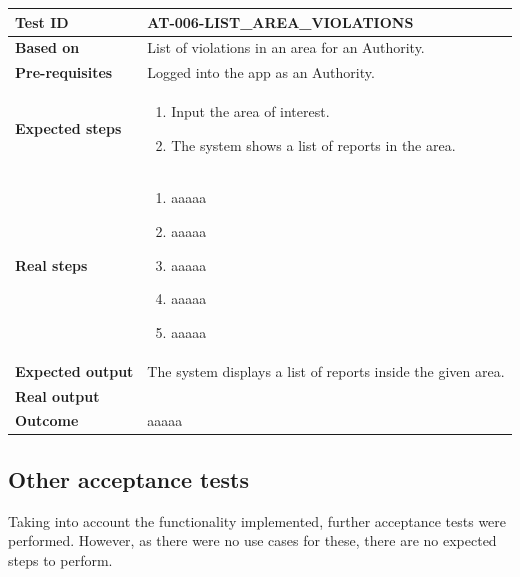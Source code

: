 \begin{table}[H]
    \centering
    \begin{tabular}{p{3cm}p{10cm}}
    \textbf{Test ID} & AT-006-LIST\_AREA\_VIOLATIONS \\ \hline
    \textbf{Based on} & List of violations in an area for an Authority. \\ \hline
    \textbf{Pre-requisites} & Logged into the app as an Authority. \\ \hline
    \textbf{Expected steps} & 
        \begin{enumerate} \itemsep0em
            \item Input the area of interest.
            \item The system shows a list of reports in the area.
        \end{enumerate} \\ \hline
    \textbf{Real steps} & 
        \begin{enumerate} \itemsep0em
            \item aaaaa
            \item aaaaa
            \item aaaaa
            \item aaaaa
            \item aaaaa
        \end{enumerate} \\ \hline
    \textbf{Expected output} & The system displays a list of reports inside the given area. \\ \hline
    \textbf{Real output} &  \\ \hline
    \textbf{Outcome} & aaaaa \\ \hline
    \end{tabular}
\end{table}

\subsection{Other acceptance tests}
Taking into account the functionality implemented, further acceptance tests were performed. However, as there were no use cases for these, there are no expected steps to perform. \\

